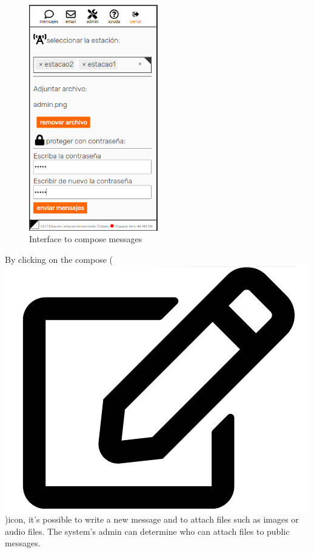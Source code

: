 \documentclass[11pt,a4paper]{article}
\begin{document}
\begin{figure}[H]
    \centering
    \includegraphics[width=0.5\textwidth]{screenshots/frontend/es/publicas2.png}
    \caption{Interface to compose messages}
    \label{fig:compose2}
\end{figure}

By clicking on the compose (\includegraphics[height=0.8\baselineskip]{pictures/edit.png})icon, it's possible to write a new message and to attach files such as images or audio files. The system's admin can determine who can attach files to public messages. 
\end{document}

